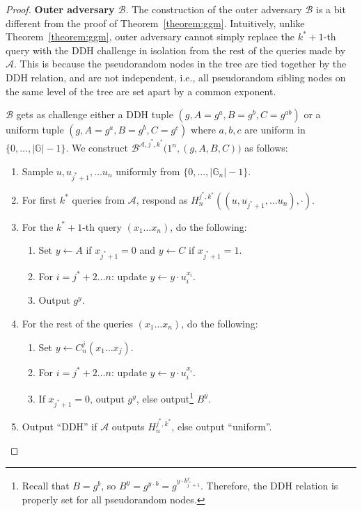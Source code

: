 \begin{proof}
    \noindent \textbf{Outer adversary $\mathcal{B}$}. The construction of the outer adversary $\mathcal{B}$ is a bit different from the proof of Theorem~\ref{theorem:ggm}. Intuitively, unlike Theorem~\ref{theorem:ggm}, outer adversary cannot simply replace the $k^*+1$-th query with the DDH challenge in isolation from the rest of the queries made by $\mathcal{A}$. This is because the pseudorandom nodes in the tree are tied together by the DDH relation, and are not independent, i.e., all pseudorandom sibling nodes on the same level of the tree are set apart by a common exponent.

    $\mathcal{B}$ gets as challenge either a DDH tuple $(g, A=g^a, B=g^b, C=g^{ab})$ or a uniform tuple $(g, A=g^a, B=g^b, C=g^c)$ where $a, b, c$ are uniform in $\{0, \dots, |\mathbb{G}|-1\}$. We construct $\mathcal{B}^{\mathcal{A}, j^*, k^*}\big(1^n, (g, A, B, C)\big)$ as follows:
    \begin{enumerate}
        \item Sample $u, u_{j^*+1}, \ldots u_n$ uniformly from $\{0, \dots, |\mathbb{G}_n|-1\}$.
        \item For first $k^*$ queries from $\mathcal{A}$, respond as $H_n^{j^*, k^*}((u, u_{j^*+1}, \ldots u_n),\cdot)$.
        \item For the $k^*+1$-th query $(x_1\ldots x_n)$, do the following:
              \begin{enumerate}
                  \item Set $y \gets A$ if $x_{j^*+1} = 0$ and $y \gets C$ if $x_{j^*+1} = 1$.
                  \item For $i = j^*+2 \dots n$: update $y \gets y \cdot u_i^{x_i}$.
                  \item Output $g^y$.
              \end{enumerate}
        \item For the rest of the queries $(x_1\ldots x_n)$, do the following:
              \begin{enumerate}
                  \item Set $y \gets C^j_n(x_1\ldots x_j)$.
                  \item For $i = j^*+2 \dots n$: update $y \gets y \cdot u_i^{x_i}$.
                  \item If $x_{j^*+1} = 0$, output $g^y$, else output\footnote{Recall that $B=g^b$, so $B^y = g^{y\cdot b} = g^{y\cdot b^x_{j^*+1}}$. Therefore, the DDH relation is properly set for all pseudorandom nodes.} $B^y$.
              \end{enumerate}
        \item Output ``DDH'' if $\mathcal{A}$ outputs $H_n^{j^*, k^*}$, else output ``uniform''.
    \end{enumerate}


\end{proof}
